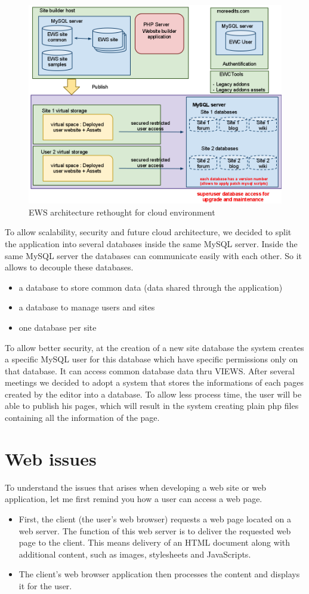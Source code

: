 \begin{figure}[!ht]
\centering
\includegraphics[width=.55\textwidth]{img/ews_archi_after.png}
\caption{EWS architecture rethought for cloud environment}
\label{figure:ews_archi_after}
\end{figure}

To allow scalability, security and future cloud architecture, we decided to split the application into several databases inside the same MySQL server. Inside the same MySQL server the databases can communicate easily with each other. So it allows to decouple these databases.
\begin{itemize}
\item a database to store common data (data shared through the application)
\item a database to manage users and sites
\item one database per site 
\end{itemize}
To allow better security, at the creation of a new site database the system creates a specific MySQL user for this database which have specific permissions only on that database. It can access common database data thru VIEWS.
After several meetings we decided to adopt a system that stores the informations of each pages created by the editor into a database. To allow less process time, the user will be able to publish his pages, which will result in the system creating plain php files containing all the information of the page.

\section{Web issues}

To understand the issues that arises when developing a web site or web application, let me first remind you how a user can access a web page.
\begin{itemize}
\item First, the client (the user's web browser) requests a web page located on a web server. The function of this web server is to deliver the requested web page to the client. This means delivery of an HTML document along with additional content, 
such as images, stylesheets and JavaScripts.
\item The client's web browser application then processes the content and displays it for the user.  
\end{itemize}

